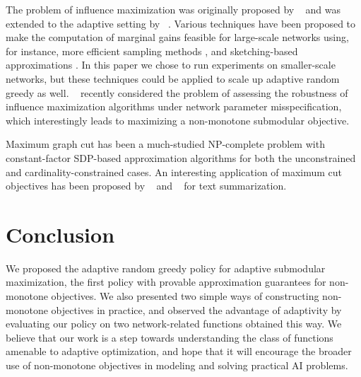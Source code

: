 \documentclass{article}
\newcommand{\citet}[1]{\citeauthor{#1}~\shortcite{#1}}
\begin{document}
The problem of influence maximization was originally proposed by \citet{kempe03} and was extended to the adaptive setting by \citet{golovin11}.
Various techniques have been proposed to make the computation of marginal gains feasible for large-scale networks using, for instance, more efficient sampling methods \cite{ohsaka14}, and sketching-based approximations \cite{cohen14}.
In this paper we chose to run experiments on smaller-scale networks, but these techniques could be applied to scale up adaptive random greedy as well.
\citet{he14} recently considered the problem of assessing the robustness of influence maximization algorithms under network parameter misspecification, which interestingly leads to maximizing a non-monotone submodular objective.

Maximum graph cut has been a much-studied NP-complete problem with constant-factor SDP-based approximation algorithms for both the unconstrained \cite{goemans95} and cardinality-constrained \cite{feige01} cases.
An interesting application of maximum cut objectives has been proposed by \citet{lin10} and \citet{lin11} for text summarization.

\section{Conclusion}
We proposed the adaptive random greedy policy for adaptive submodular maximization, the first policy with provable approximation guarantees for non-monotone objectives.
We also presented two simple ways of constructing non-monotone objectives in practice, and observed the advantage of adaptivity by evaluating our policy on two network-related functions obtained this way.
We believe that our work is a step towards understanding the class of functions amenable to adaptive optimization, and hope that it will encourage the broader use of non-monotone objectives in modeling and solving practical AI problems.




\iftoggle{short}
{}
{
\clearpage
\appendix
\setcounter{lemma}{0}
\setcounter{theorem}{0}

}
\end{document}
